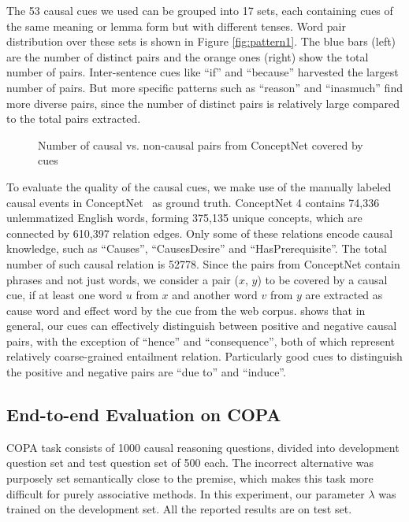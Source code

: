 The 53 causal cues we used can be grouped into 17 sets, each
containing cues of the same meaning or lemma form but with different
tenses. Word pair distribution over these sets is shown in Figure
\ref{fig:pattern1}. The blue bars (left) are the number of distinct
pairs and the orange ones (right) show the total number of pairs.
Inter-sentence cues like ``if'' and ``because'' harvested the
largest number of pairs. But more specific patterns such as
``reason'' and ``inasmuch'' find more diverse pairs, since the
number of distinct pairs is relatively large compared to the total
pairs extracted.

\begin{figure}[th]
\centering
{}
\caption{Number of causal vs. non-causal pairs from ConceptNet covered by cues}
\label{fig:pattern2}
\end{figure}

To evaluate the quality of the causal cues, we make use of the
manually labeled causal events in
ConceptNet~\cite{liu2004commonsense} as ground truth. ConceptNet 4
contains 74,336 unlemmatized English words, forming
375,135 unique concepts, which are connected by 610,397 relation edges.
Only some of these relations encode causal knowledge,
such as ``Causes'', ``CausesDesire'' and ``HasPrerequisite''.
The total number of such causal relation is 52778.
Since the pairs from ConceptNet contain
phrases and not just words, we consider a pair ($x$, $y$) to be covered by a
causal cue, if at least one word $u$ from $x$ and another word $v$ from
$y$ are extracted as cause word and effect word by the cue
from the web corpus.
 shows that in general, our cues can
effectively distinguish between positive and negative causal pairs,
with the exception of ``hence'' and ``consequence'', both of which
represent relatively coarse-grained entailment relation.
Particularly good cues to distinguish the positive and negative
pairs are ``due to'' and ``induce''.

\subsection{End-to-end Evaluation on COPA}
COPA task consists of 1000 causal reasoning questions, divided into
development question set and test question set of 500 each.
The incorrect alternative was purposely set semantically
close to the premise, which makes this task more difficult for
purely associative methods. In this experiment, our parameter $\lambda$
was trained on the development set.
All the reported results are on test set.

